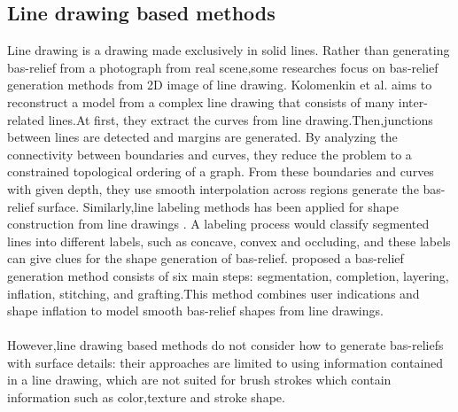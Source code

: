 \subsection{Line drawing based methods}
Line drawing is a drawing made exclusively in solid lines. Rather than generating bas-relief from a photograph from real scene,some researches focus on bas-relief generation methods from 2D image of line drawing.
Kolomenkin et al.\cite{kolomenkin2011reconstruction}  aims to reconstruct a model from a complex line drawing that consists of many inter-related lines.At first, they extract the curves from line drawing.Then,junctions between lines are detected and margins are generated. By analyzing the connectivity between boundaries and curves, they reduce the problem to a constrained topological ordering of a graph. From these boundaries and curves with given depth, they use smooth interpolation across regions generate the bas-relief surface. Similarly,line labeling methods has been applied for shape construction from line drawings  \cite{varley2002estimating}\cite{malik1987interpreting}\cite{sykora2014ink}. A labeling process would classify segmented lines into different labels, such as concave, convex and occluding, and these labels can give clues for the shape generation of bas-relief. 
\cite{sykora2014ink} proposed a bas-relief generation method consists of six main steps: segmentation, completion, layering, inflation, stitching, and grafting.This method combines user indications and shape inflation to model smooth bas-relief shapes from line drawings. \\ \\ 
However,line drawing based methods do not consider how to generate bas-reliefs with surface details: their approaches are limited to using information contained in a line drawing, which are not suited for brush strokes which contain information such as color,texture and stroke shape. 

